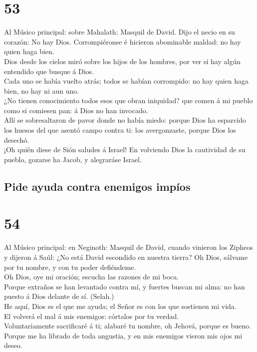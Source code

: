 \hypertarget{section-52}{%
\section{53}\label{section-52}}

 Al Músico principal: sobre Mahalath: Masquil de David. Dijo
el necio en su corazón: No hay Dios. Corrompiéronse é hicieron
abominable maldad: no hay quien haga bien.\\
 Dios desde los cielos miró sobre los hijos de los hombres,
por ver si hay algún entendido que busque á Dios.\\
 Cada uno se había vuelto atrás; todos se habían corrompido:
no hay quien haga bien, no hay ni aun uno.\\
 ¿No tienen conocimiento todos esos que obran iniquidad? que
comen á mi pueblo como si comiesen pan: á Dios no han invocado.\\
 Allí se sobresaltaron de pavor donde no había miedo: porque
Dios ha esparcido los huesos del que asentó campo contra ti: los
avergonzaste, porque Dios los desechó.\\
 ¡Oh quién diese de Sión saludes á Israel! En volviendo Dios
la cautividad de su pueblo, gozarse ha Jacob, y alegraráse Israel.

\hypertarget{pide-ayuda-contra-enemigos-impuxedos}{%
\subsection{Pide ayuda contra enemigos
impíos}\label{pide-ayuda-contra-enemigos-impuxedos}}

\hypertarget{section-53}{%
\section{54}\label{section-53}}

 Al Músico principal: en Neginoth: Masquil de David, cuando
vinieron los Zipheos y dijeron á Saúl: ¿No está David escondido en
nuestra tierra? Oh Dios, sálvame por tu nombre, y con tu poder
defiéndeme.\\
 Oh Dios, oye mi oración; escucha las razones de mi boca.\\
 Porque extraños se han levantado contra mí, y fuertes
buscan mi alma: no han puesto á Dios delante de sí. (Selah.)\\
 He aquí, Dios es el que me ayuda; el Señor es con los que
sostienen mi vida.\\
 El volverá el mal á mis enemigos: córtalos por tu verdad.\\
 Voluntariamente sacrificaré á ti; alabaré tu nombre, oh
Jehová, porque es bueno.\\
 Porque me ha librado de toda angustia, y en mis enemigos
vieron mis ojos mi deseo.

